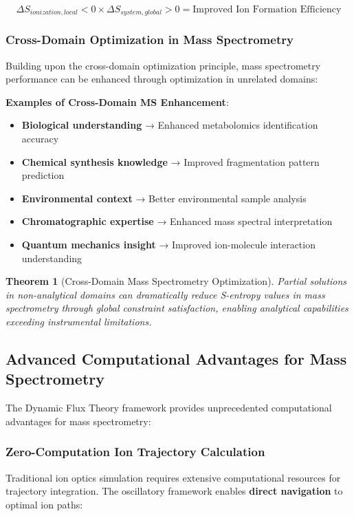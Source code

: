 \documentclass[11pt,a4paper]{article}
\newtheorem{theorem}{Theorem}[section]
\theoremstyle{remark}
\begin{document}
$$\Delta S_{ionization,local} < 0 \times \Delta S_{system,global} > 0 = \text{Improved Ion Formation Efficiency}$$

\subsubsection{Cross-Domain Optimization in Mass Spectrometry}

Building upon the cross-domain optimization principle, mass spectrometry performance can be enhanced through optimization in unrelated domains:

\textbf{Examples of Cross-Domain MS Enhancement}:
\begin{itemize}
\item \textbf{Biological understanding} → Enhanced metabolomics identification accuracy
\item \textbf{Chemical synthesis knowledge} → Improved fragmentation pattern prediction  
\item \textbf{Environmental context} → Better environmental sample analysis
\item \textbf{Chromatographic expertise} → Enhanced mass spectral interpretation
\item \textbf{Quantum mechanics insight} → Improved ion-molecule interaction understanding
\end{itemize}

\begin{theorem}[Cross-Domain Mass Spectrometry Optimization]
Partial solutions in non-analytical domains can dramatically reduce S-entropy values in mass spectrometry through global constraint satisfaction, enabling analytical capabilities exceeding instrumental limitations.
\end{theorem}

\subsection{Advanced Computational Advantages for Mass Spectrometry}

The Dynamic Flux Theory framework provides unprecedented computational advantages for mass spectrometry:

\subsubsection{Zero-Computation Ion Trajectory Calculation}

Traditional ion optics simulation requires extensive computational resources for trajectory integration. The oscillatory framework enables \textbf{direct navigation} to optimal ion paths:
\end{document}

